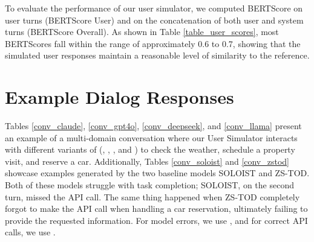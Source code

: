 To evaluate the performance of our user simulator, we computed BERTScore on user turns (BERTScore User) and on the concatenation of both user and system turns (BERTScore Overall). As shown in Table \ref{table_user_scores}, most BERTScores fall within the range of approximately 0.6 to 0.7, showing that the simulated user responses maintain a reasonable level of similarity to the reference.


\section{Example Dialog Responses}
\label{sec:Example_Dialog_Responses}

Tables \ref{conv_claude}, \ref{conv_gpt4o}, \ref{conv_deepseek}, and \ref{conv_llama} present an example of a multi-domain conversation where our User Simulator interacts with different variants of {\ours} (\ClaudeShortName, \GPTShortName, \DeepSeekShortName, and \LlamaShortName) to check the weather, schedule a property visit, and reserve a car. %
Additionally, Tables \ref{conv_soloist} and \ref{conv_zstod} showcase examples generated by the two baseline models SOLOIST and ZS-TOD. Both of these models struggle with task completion; SOLOIST, on the second turn, missed the API call. The same thing happened when ZS-TOD completely forgot to make the API call when handling a car reservation, ultimately failing to provide the requested information. For model errors, we use {\xmark}, and for correct API calls, we use {\cmark}.





